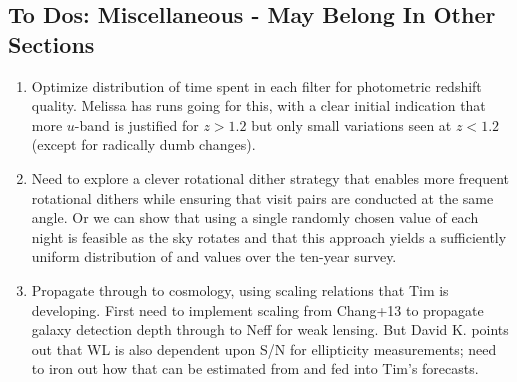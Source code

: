 \subsection{To Dos: Miscellaneous - May Belong In Other Sections}
\begin{enumerate}
\item Optimize distribution of time spent in each filter for photometric redshift quality.  Melissa has runs going for this, with a clear initial indication that more $u$-band is justified for $z>1.2$ but only small variations seen at $z<1.2$ (except for radically dumb changes).
\item Need to explore a clever rotational dither strategy that enables more frequent rotational dithers while ensuring that visit pairs are conducted at the same  angle. Or we can show that using a single randomly chosen value of  each night is feasible as the sky rotates and that this approach yields a sufficiently uniform distribution of  and  values over the ten-year survey.
\item Propagate through to cosmology, using scaling relations that Tim is developing.  First need to implement scaling from Chang+13 to propagate galaxy detection depth through to Neff for weak lensing.  But David K. points out that WL is also dependent upon S/N for ellipticity measurements; need to iron out how that can be estimated from  and fed into Tim's forecasts.
  
\end{enumerate}

 
